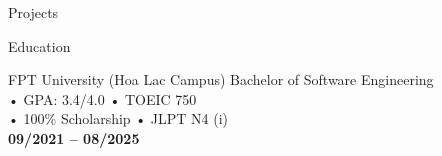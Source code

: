 \documentclass[]{style}
\newcommand{\bolddate}[1]{\textbf{#1}}
\begin{document}
\begin{section}{Projects}


\end{section}

\begin{section}{Education}
 \begin{educationsubsection}
   {FPT University (Hoa Lac Campus)}
   {
     Bachelor of Software Engineering \\
     • GPA: 3.4/4.0 \hspace{3cm} • TOEIC 750 \\
     • 100\% Scholarship \hspace{2cm} • JLPT N4 (i) \\
   }
   {\bolddate{09/2021 -- 08/2025}}{}
 \end{educationsubsection}
\end{section}
\end{document}
